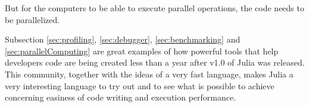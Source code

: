 But for the computers to be able to execute parallel operations, the code needs to be parallelized. 

Subsection \ref{sec:profiling}, \ref{sec:debugger}, \ref{sec:benchmarking} and \ref{sec:parallelComputing} are great examples of how powerful tools that help developers code are being created less than a year after v1.0 of Julia was released. This community, together with the ideas of a very fast language, makes Julia a very interesting language to try out and to see what is possible to achieve concerning easiness of code writing and execution performance.